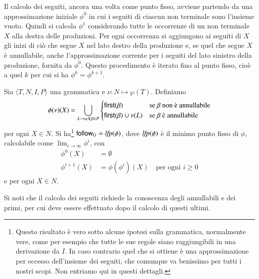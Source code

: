 Il calcolo dei seguiti, ancora una volta come punto fisso, avviene partendo
da una approssimazione iniziale $\phi^0$ in cui i seguiti di ciascun non
terminale sono l'insieme vuoto. Quindi si calcola $\phi^1$ considerando
tutte le occorrenze di un non terminale $X$ alla destra delle produzioni.
Per ogni occorrenza si aggiungono ai seguiti di $X$
gli inizi di ci\`o che segue $X$ nel lato destro della produzione e,
se quel che segue $X$ \`e annullabile, anche l'approssimazione corrente
per i seguiti del lato sinistro della produzione, fornita da $\phi^0$.
Questo procedimento \`e iterato fino al punto fisso, cio\`e a quel $k$ per
cui si ha $\phi^k=\phi^{k+1}$.
%
\begin{proposition}\label{prop:follow}
Sia $\langle T,N,I,P\rangle$ una grammatica e $\nu:N\mapsto\wp(T)$. Definiamo
\[
  \phi(\nu)(X)=\bigcup\limits_{L\to\alpha X\beta\in P}\begin{cases}
    \mathsf{first}(\beta) & \text{se $\beta$ non \`e annullabile}\\
    \mathsf{first}(\beta)\cup\nu(L) & \text{se $\beta$ \`e annullabile}
  \end{cases}
\]
per ogni $X\in N$. Si ha\footnote{Questo risultato \`e vero sotto alcune
ipotesi sulla grammatica, normalmente vere,
come per esempio che tutte le sue regole siano
raggiungibili in una derivazione da $I$. In caso contrario quel che si ottiene
\`e una approssimazione per eccesso dell'insieme dei seguiti, che comunque
va benissimo per tutti i nostri scopi. Non entriamo qui in questi dettagli.}
$\mathsf{follow}_G=\mathit{lfp}(\phi)$, dove $\mathit{lfp}(\phi)$ \`e il
minimo punto fisso di $\phi$, calcolabile come $\lim_{i\to\infty}\phi^i$, con
\begin{align*}
  \phi^0(X)&=\emptyset \\
  \phi^{i+1}(X)&=\phi(\phi^i)(X)\quad\text{per ogni $i\ge 0$}
\end{align*}
e per ogni $X\in N$.
\end{proposition}
%
\noindent
Si noti che il calcolo dei seguiti richiede la conoscenza degli annullabili e
dei primi, per cui deve essere effettuato dopo il calcolo di questi ultimi.

